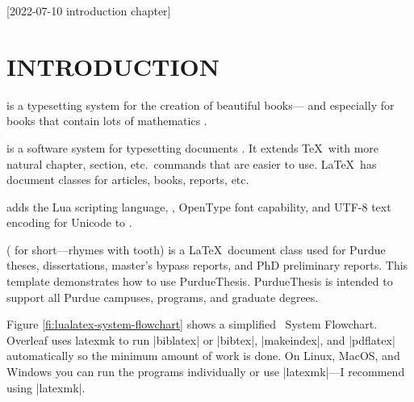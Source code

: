 [2022-07-10 introduction chapter]

\chapter{INTRODUCTION}

{\sl\TeXLogo\/} is a typesetting system for the creation of beautiful books---%
and especially for books that contain lots of mathematics
\cite[page v]{knuth2012}.

{\sl\LaTeXLogo\/} is a software system for typesetting documents
\cite[back cover]{lamport1994}.
It extends \TeX\ with more natural chapter,
section,
etc.~commands that are easier to use.
\LaTeX\ has document classes for
articles,
books,
reports,
etc.

{\sl\LuaLaTeXLogo\/} adds
the Lua scripting language,
\MetaPostLogo
\cite{metapost-on-the-web},
OpenType font capability,
and UTF-8
\cite{wikipedia-utf-8}
text encoding for Unicode
\cite{wikipedia-unicode}
to \LaTeXLogo.

{\sl\PurdueThesisLogo\/}
({\sl\PuThLogo} for short---rhymes with tooth)
is a \LaTeX\ document class used for Purdue theses,
dissertations,
master’s bypass reports,
and PhD preliminary reports.
This template demonstrates how to use PurdueThesis.
PurdueThesis is intended to support all Purdue campuses,
programs,
and graduate degrees.

Figure \ref{fi:lualatex-system-flowchart} shows a simplified \LuaLaTeXLogo\ System Flowchart.
Overleaf
\cite{overleaf}
uses latexmk
\cite{latexmk}
to run
|biblatex| or |bibtex|,
|makeindex|,
and |pdflatex| automatically
so the minimum amount of work is done.
On Linux,
MacOS,
and Windows you can run the programs individually
or use |latexmk|---I recommend using |latexmk|.
  
